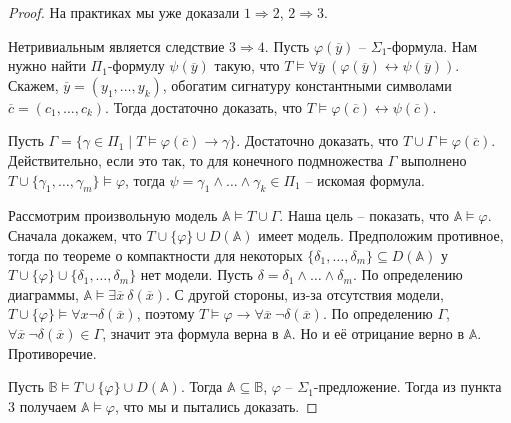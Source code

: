 \begin{proof}
    На практиках мы уже доказали $1 \Rightarrow 2$, $2 \Rightarrow 3$.

    Нетривиальным является следствие $3 \Rightarrow 4$. Пусть $\varphi(\overline{y})$ -- $\Sigma_1$-формула. Нам нужно найти $\Pi_1$-формулу $\psi(\overline{y})$ такую, что $T \models \forall \overline{y}~(\varphi(\overline{y}) \leftrightarrow \psi(\overline{y}))$. Скажем, $\overline{y} = (y_1, \ldots, y_k)$, обогатим сигнатуру константными символами $\overline{c} = (c_1, \ldots, c_k)$. Тогда достаточно доказать, что $T \models \varphi(\overline{c}) \leftrightarrow \psi(\overline{c})$. 

    Пусть $\Gamma = \{\gamma\in \Pi_1 \mid T \models \varphi(\overline{c}) \rightarrow \gamma\}.$
    Достаточно доказать, что $T \cup \Gamma \models \varphi(\overline{c})$. Действительно, если это так, то для конечного подмножества $\Gamma$ выполнено $T \cup \{\gamma_1, \ldots, \gamma_m\} \models \varphi$, тогда $\psi = \gamma_1 \wedge \ldots \wedge \gamma_k \in \Pi_1$ -- искомая формула.

    Рассмотрим произвольную модель $\mathbb{A}\models T\cup\Gamma$. Наша цель -- показать, что $\mathbb{A}\models\varphi$. Сначала докажем, что $T\cup\{\varphi\}\cup D(\mathbb{A})$ имеет модель. Предположим противное, тогда по теореме о компактности для некоторых $\{\delta_1, \ldots, \delta_m\}\subseteq D(\mathbb{A})$ у $T\cup \{\varphi\} \cup \{\delta_1, \ldots, \delta_m\}$ нет модели. Пусть $\delta = \delta_1\wedge\ldots\wedge\delta_m$. По определению диаграммы, $\mathbb{A}\models \exists \overline{x}~\delta(\overline{x})$. С другой стороны, из-за отсутствия модели, $T\cup\{\varphi\}\models \forall x \neg \delta(\overline{x})$, поэтому $T\models \varphi\rightarrow \forall \overline{x}~\neg \delta(\overline{x})$. По определению $\Gamma$, $\forall \overline{x}~\neg\delta(\overline{x})\in \Gamma$, значит эта формула верна в $\mathbb{A}$. Но и её отрицание верно в $\mathbb{A}$. Противоречие.

    Пусть $\mathbb{B}\models T\cup\{\varphi\}\cup D(\mathbb{A})$. Тогда $\mathbb{A}\subseteq\mathbb{B}$, $\varphi$ -- $\Sigma_1$-предложение. Тогда из пункта 3 получаем $\mathbb{A}\models \varphi$, что мы и пытались доказать.


\end{proof}
